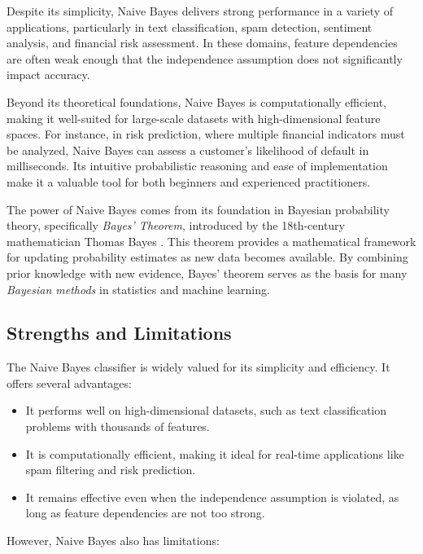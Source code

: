 \documentclass[
  11pt,
]{book}
\providecommand{\tightlist}{%
  \setlength{\itemsep}{0pt}\setlength{\parskip}{0pt}}
\theoremstyle{definition}
\theoremstyle{definition}
\theoremstyle{definition}
\theoremstyle{definition}
\theoremstyle{remark}
\begin{document}
Despite its simplicity, Naive Bayes delivers strong performance in a variety of applications, particularly in text classification, spam detection, sentiment analysis, and financial risk assessment. In these domains, feature dependencies are often weak enough that the independence assumption does not significantly impact accuracy.

Beyond its theoretical foundations, Naive Bayes is computationally efficient, making it well-suited for large-scale datasets with high-dimensional feature spaces. For instance, in risk prediction, where multiple financial indicators must be analyzed, Naive Bayes can assess a customer's likelihood of default in milliseconds. Its intuitive probabilistic reasoning and ease of implementation make it a valuable tool for both beginners and experienced practitioners.

The power of Naive Bayes comes from its foundation in Bayesian probability theory, specifically \emph{Bayes' Theorem}, introduced by the 18th-century mathematician Thomas Bayes \citep{bayes1958essay}. This theorem provides a mathematical framework for updating probability estimates as new data becomes available. By combining prior knowledge with new evidence, Bayes' theorem serves as the basis for many \emph{Bayesian methods} in statistics and machine learning.

\subsection*{Strengths and Limitations}\label{strengths-and-limitations}


The Naive Bayes classifier is widely valued for its simplicity and efficiency. It offers several advantages:

\begin{itemize}
\tightlist
\item
  It performs well on high-dimensional datasets, such as text classification problems with thousands of features.\\
\item
  It is computationally efficient, making it ideal for real-time applications like spam filtering and risk prediction.\\
\item
  It remains effective even when the independence assumption is violated, as long as feature dependencies are not too strong.
\end{itemize}

However, Naive Bayes also has limitations:
\end{document}
